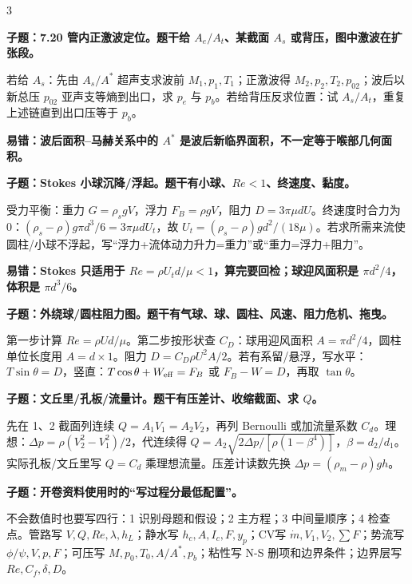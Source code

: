 \documentclass[a4paper]{article}
\newcommand{\qt}[1]{\vspace{0.10pt}\colorbox{Q}{\parbox{\dimexpr\linewidth-2\fboxsep}{\color{white}\bfseries #1}}\par}
\newcommand{\ans}[1]{\colorbox{G}{\parbox{\dimexpr\linewidth-2\fboxsep}{#1}}\par}
\newcommand{\warn}[1]{\colorbox{Y}{\parbox{\dimexpr\linewidth-2\fboxsep}{\color{E}\bfseries #1}}\par}
\begin{document}
\begin{multicols}{3}
\qt{子题：7.20 管内正激波定位。题干给 $A_e/A_t$、某截面 $A_s$ 或背压，图中激波在扩张段。}
\ans{若给 $A_s$：先由 $A_s/A^*$ 超声支求波前 $M_1,p_1,T_1$；正激波得 $M_2,p_2,T_2,p_{02}$；波后以新总压 $p_{02}$ 亚声支等熵到出口，求 $p_e$ 与 $p_b$。若给背压反求位置：试 $A_s/A_t$，重复上述链直到出口压等于 $p_b$。}
\warn{易错：波后面积--马赫关系中的 $A^*$ 是波后新临界面积，不一定等于喉部几何面积。}
\qt{子题：Stokes 小球沉降/浮起。题干有小球、$Re<1$、终速度、黏度。}
\ans{受力平衡：重力 $G=\rho_s gV$，浮力 $F_B=\rho gV$，阻力 $D=3\pi\mu dU$。终速度时合力为0：$(\rho_s-\rho)g\pi d^3/6=3\pi\mu dU_t$，故 $U_t=(\rho_s-\rho)gd^2/(18\mu)$。若求所需来流使圆柱/小球不浮起，写“浮力+流体动力升力=重力”或“重力=浮力+阻力”。}
\warn{易错：Stokes 只适用于 $Re=\rho U_td/\mu<1$，算完要回检；球迎风面积是 $\pi d^2/4$，体积是 $\pi d^3/6$。}
\qt{子题：外绕球/圆柱阻力图。题干有气球、球、圆柱、风速、阻力危机、拖曳。}
\ans{第一步计算 $Re=\rho Ud/\mu$。第二步按形状查 $C_D$：球用迎风面积 $A=\pi d^2/4$，圆柱单位长度用 $A=d\times1$。阻力 $D=C_D\rho U^2A/2$。若有系留/悬浮，写水平：$T\sin\theta=D$，竖直：$T\cos\theta+W_{\rm eff}=F_B$ 或 $F_B-W=D$，再取 $\tan\theta$。}
\qt{子题：文丘里/孔板/流量计。题干有压差计、收缩截面、求 $Q$。}
\ans{先在 1、2 截面列连续 $Q=A_1V_1=A_2V_2$，再列 Bernoulli 或加流量系数 $C_d$。理想：$\Delta p=\rho(V_2^2-V_1^2)/2$，代连续得 $Q=A_2\sqrt{2\Delta p/[\rho(1-\beta^4)]}$，$\beta=d_2/d_1$。实际孔板/文丘里写 $Q=C_d$ 乘理想流量。压差计读数先换 $\Delta p=(\rho_m-\rho)gh$。}
\qt{子题：开卷资料使用时的“写过程分最低配置”。}
\ans{不会数值时也要写四行：1 识别母题和假设；2 主方程；3 中间量顺序；4 检查点。管路写 $V,Q,Re,\lambda,h_L$；静水写 $h_c,A,I_c,F,y_p$；CV写 $\dot m,V_1,V_2,\sum F$；势流写 $\phi/\psi,V,p,F$；可压写 $M,p_0,T_0,A/A^*,p_b$；粘性写 N-S 删项和边界条件；边界层写 $Re,C_f,\delta,D$。}


\end{multicols}
\end{document}
